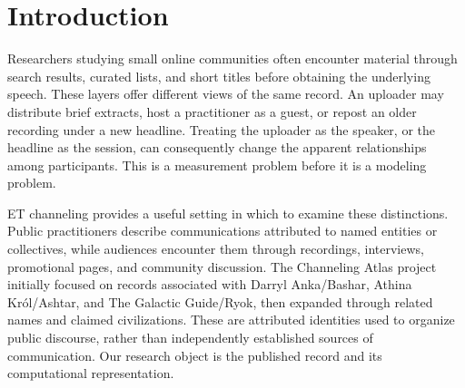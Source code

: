 \begin{abstract}
Public videos described as extraterrestrial (ET) channeling circulate through practitioners' accounts, interview programs, and repost channels. Comparing these records requires distinguishing a human speaker from an uploader and a title from spoken content. We present an exploratory, source-linked study of a bounded YouTube index assembled from an existing research atlas and a supplied research archive. The merged sample contains 925 unique upload identifiers; refreshed and explicitly labeled inherited metadata provide 881 usable durations and 880 exact publication dates. We compare sampled upload lengths, transparent keyword indicators, sparse lexical representations, and learned sentence embeddings. A purposive caption pilot retrieves 34 tracks from 36 attempts and retains 30 English documents. In the matched text-layer comparison, 22 videos from 11 publishing accounts contribute to 55 account pairs; title-based and caption-based similarity rankings correlate at only $\rho=0.206$. Name-and-genre masking changes title rankings ($\rho=0.626$), whereas excluding repeated title strings changes them little ($\rho=0.992$). Positionally trimming caption openings and endings preserves broad pair rankings ($\rho=0.969$) but changes four of 13 accounts' nearest neighbors. These descriptive results show that account identity, text layer, and sampling decisions materially affect comparisons in this corpus. They do not assess the origin or truth of channeling claims. We release provenance-preserving metadata, derived features, executable analysis, and an updateable dashboard, while marking human validation and further analyses as TBD.
\end{abstract}

\section{Introduction}
Researchers studying small online communities often encounter material through search results, curated lists, and short titles before obtaining the underlying speech. These layers offer different views of the same record. An uploader may distribute brief extracts, host a practitioner as a guest, or repost an older recording under a new headline. Treating the uploader as the speaker, or the headline as the session, can consequently change the apparent relationships among participants. This is a measurement problem before it is a modeling problem.

ET channeling provides a useful setting in which to examine these distinctions. Public practitioners describe communications attributed to named entities or collectives, while audiences encounter them through recordings, interviews, promotional pages, and community discussion. The Channeling Atlas project initially focused on records associated with Darryl Anka/Bashar, Athina Kr\'ol/Ashtar, and The Galactic Guide/Ryok, then expanded through related names and claimed civilizations. These are attributed identities used to organize public discourse, rather than independently established sources of communication. Our research object is the published record and its computational representation.

